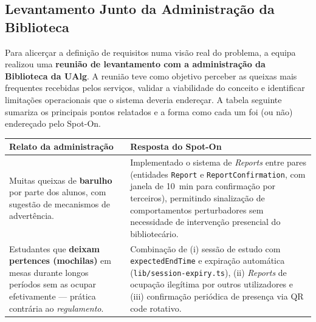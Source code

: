 \documentclass[11pt,a4paper]{article}
\begin{document}
\subsection{Levantamento Junto da Administração da Biblioteca}\label{sec:interview}

Para alicerçar a definição de requisitos numa visão real do problema, a
equipa realizou uma \textbf{reunião de levantamento com a administração da
Biblioteca da UAlg}. A reunião teve como objetivo perceber as queixas mais
frequentes recebidas pelos serviços, validar a viabilidade do conceito e
identificar limitações operacionais que o sistema deveria endereçar. A
tabela seguinte sumariza os principais pontos relatados e a forma como cada
um foi (ou não) endereçado pelo Spot-On.

\begin{table}[h!]
    \centering
    \footnotesize
    \renewcommand{\arraystretch}{1.35}
    \begin{tabularx}{\linewidth}{@{}>{\raggedright\arraybackslash}p{5.2cm}X@{}}
        \toprule
        \textbf{Relato da administração}                                                                                                                          & \textbf{Resposta do Spot-On}                                                                                                                                                                                                                                                                                                                                          \\
        \midrule
        Muitas queixas de \textbf{barulho} por parte dos alunos, com sugestão de mecanismos de advertência.                                                       & Implementado o sistema de \emph{Reports} entre pares (entidades \texttt{Report} e \texttt{ReportConfirmation}, com janela de 10~min para confirmação por terceiros), permitindo sinalização de comportamentos perturbadores sem necessidade de intervenção presencial do bibliotecário.                                                                              \\
        \midrule
        Estudantes que \textbf{deixam pertences (mochilas)} em mesas durante longos períodos sem as ocupar efetivamente --- prática contrária ao \emph{regulamento}. & Combinação de (i) sessão de estudo com \texttt{expectedEndTime} e expiração automática (\texttt{lib/session-expiry.ts}), (ii) \emph{Reports} de ocupação ilegítima por outros utilizadores e (iii) confirmação periódica de presença via QR code rotativo.                                                                                                          \\

\end{tabularx}
\end{table}
\end{document}
